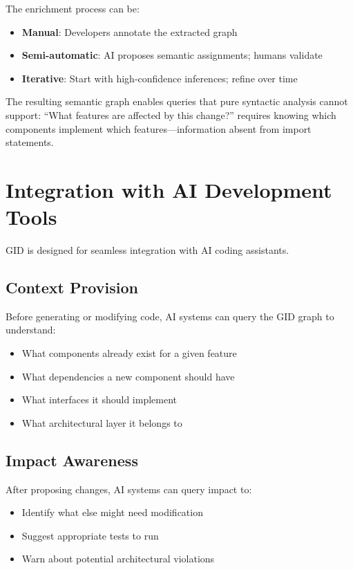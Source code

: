 \documentclass[11pt,a4paper]{article}
\begin{document}
The enrichment process can be:
\begin{itemize}[noitemsep]
    \item \textbf{Manual}: Developers annotate the extracted graph
    \item \textbf{Semi-automatic}: AI proposes semantic assignments; humans validate
    \item \textbf{Iterative}: Start with high-confidence inferences; refine over time
\end{itemize}

The resulting semantic graph enables queries that pure syntactic analysis cannot support: ``What features are affected by this change?'' requires knowing which components implement which features---information absent from import statements.

\section{Integration with AI Development Tools}

GID is designed for seamless integration with AI coding assistants.

\subsection{Context Provision}

Before generating or modifying code, AI systems can query the GID graph to understand:
\begin{itemize}[noitemsep]
    \item What components already exist for a given feature
    \item What dependencies a new component should have
    \item What interfaces it should implement
    \item What architectural layer it belongs to
\end{itemize}

\subsection{Impact Awareness}

After proposing changes, AI systems can query impact to:
\begin{itemize}[noitemsep]
    \item Identify what else might need modification
    \item Suggest appropriate tests to run
    \item Warn about potential architectural violations
\end{itemize}
\end{document}
